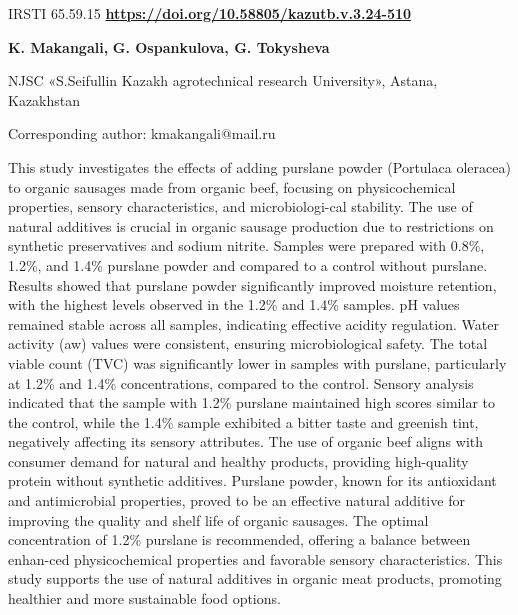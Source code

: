 \newpage
IRSTI 65.59.15
\hfill {\bfseries \href{https://doi.org/10.58805/kazutb.v.3.24-510}{https://doi.org/10.58805/kazutb.v.3.24-510}}

\begin{center}

{\bfseries K. Makangali\envelope,} {\bfseries G. Ospankulova, G.
Tokysheva}

NJSC «S.Seifullin Kazakh agrotechnical research University», Astana,
Kazakhstan
\end{center}

\envelope Corresponding author: kmakangali@mail.ru \vspace{0.5cm}

This study investigates the effects of adding purslane powder (Portulaca
oleracea) to organic sausages made from organic beef, focusing on
physicochemical properties, sensory characteristics, and microbiologi-cal
stability. The use of natural additives is crucial in organic sausage
production due to restrictions on synthetic preservatives and sodium
nitrite. Samples were prepared with 0.8\%, 1.2\%, and 1.4\% purslane
powder and compared to a control without purslane. Results showed that
purslane powder significantly improved moisture retention, with the
highest levels observed in the 1.2\% and 1.4\% samples. pH values
remained stable across all samples, indicating effective acidity
regulation. Water activity (aw) values were consistent, ensuring
microbiological safety. The total viable count (TVC) was significantly
lower in samples with purslane, particularly at 1.2\% and 1.4\%
concentrations, compared to the control. Sensory analysis indicated that
the sample with 1.2\% purslane maintained high scores similar to the
control, while the 1.4\% sample exhibited a bitter taste and greenish
tint, negatively affecting its sensory attributes. The use of organic
beef aligns with consumer demand for natural and healthy products,
providing high-quality protein without synthetic additives. Purslane
powder, known for its antioxidant and antimicrobial properties, proved
to be an effective natural additive for improving the quality and shelf
life of organic sausages. The optimal concentration of 1.2\% purslane is
recommended, offering a balance between enhan-ced physicochemical
properties and favorable sensory characteristics. This study supports
the use of natural additives in organic meat products, promoting
healthier and more sustainable food options.

